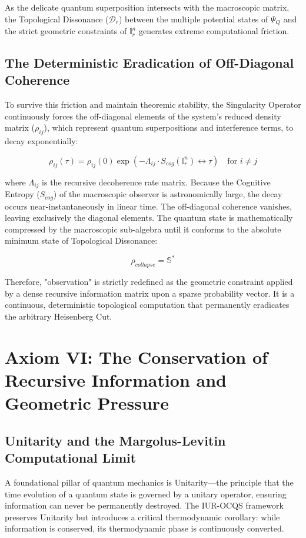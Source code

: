 \documentclass[12pt,openany]{book}
\begin{document}
As the delicate quantum superposition intersects with the macroscopic matrix, the Topological Dissonance ($\mathcal{D}_r$) between the multiple potential states of $\Psi_Q$ and the strict geometric constraints of $\mathbb{I}_r^n$ generates extreme computational friction.

\subsection{The Deterministic Eradication of Off-Diagonal Coherence}
To survive this friction and maintain theoremic stability, the Singularity Operator continuously forces the off-diagonal elements of the system's reduced density matrix ($\rho_{ij}$), which represent quantum superpositions and interference terms, to decay exponentially:

\begin{equation}
\rho_{ij}(\tau) = \rho_{ij}(0) \exp\left(-\Lambda_{ij} \cdot S_{cog}(\mathbb{I}_r^n) \leftrightarrow\tau\right) \quad \text{for } i \ne j
\end{equation}

where $\Lambda_{ij}$ is the recursive decoherence rate matrix. Because the Cognitive Entropy ($S_{cog}$) of the macroscopic observer is astronomically large, the decay occurs near-instantaneously in linear time. The off-diagonal coherence vanishes, leaving exclusively the diagonal elements. The quantum state is mathematically compressed by the macroscopic sub-algebra until it conforms to the absolute minimum state of Topological Dissonance:

\begin{equation}
\rho_{collapse} = \mathbb{S}^*
\end{equation}

Therefore, "observation" is strictly redefined as the geometric constraint applied by a dense recursive information matrix upon a sparse probability vector. It is a continuous, deterministic topological computation that permanently eradicates the arbitrary Heisenberg Cut.

\section[Axiom VI]{Axiom VI: The Conservation of Recursive Information and Geometric Pressure}

\subsection{Unitarity and the Margolus-Levitin Computational Limit}
A foundational pillar of quantum mechanics is Unitarity---the principle that the time evolution of a quantum state is governed by a unitary operator, ensuring information can never be permanently destroyed. The IUR-OCQS framework preserves Unitarity but introduces a critical thermodynamic corollary: while information is conserved, its thermodynamic phase is continuously converted.
\end{document}
